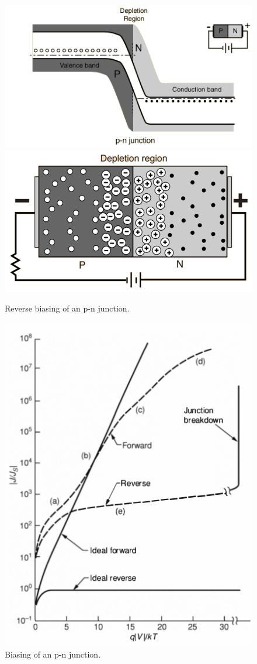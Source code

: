 \documentclass[main]{subfiles}
\begin{document}
\begin{figure}[H]
\centering
\includegraphics[scale=0.8]{pics/reverse_bias.png}
\includegraphics[scale=0.6]{pics/reverse_bias2.png}
\caption{Reverse biasing of an p-n junction.}
\end{figure}

\begin{figure}[H]
\centering
\includegraphics[scale=0.5]{pics/biasing.png}
\caption{Biasing of an p-n junction.}
\end{figure}
\end{document}
